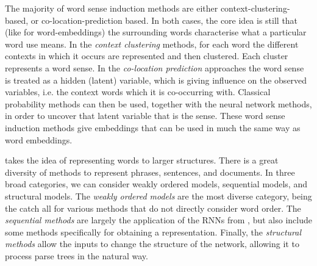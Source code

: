 \documentclass[12pt,parskip]{komatufte}
\begin{document}
The majority of word sense induction methods are either context-clustering-based, or co-location-prediction based.
In both cases, the core idea is still that (like for word-embeddings) the surrounding words characterise what a particular word use means.
In the \emph{context clustering} methods, for each word the different contexts in which it occurs are represented and then clustered.
Each cluster represents a word sense.
In the \emph{co-location prediction} approaches the word sense is treated as a hidden (latent) variable,
which is giving influence on the observed variables, i.e. the context words which it is co-occurring with.
Classical probability methods can then be used, together with the neural network methods, in order to uncover that latent variable that is the sense.
These word sense induction methods give embeddings that can be used in much the same way as word embeddings.



 takes the idea of representing words to larger structures.
There is a great diversity of methods to represent phrases, sentences, and documents.
In three broad categories, we can consider weakly ordered models, sequential models, and structural models.
The \emph{weakly ordered models} are the most diverse category, being the catch all for various methods that do not directly consider word order.
The \emph{sequential methods} are largely the application of the RNNs from ,
but also include some methods specifically for obtaining a representation.
Finally, the \emph{structural methods} allow the inputs to change the structure of the network,
allowing it to process parse trees in the natural way.
\end{document}

